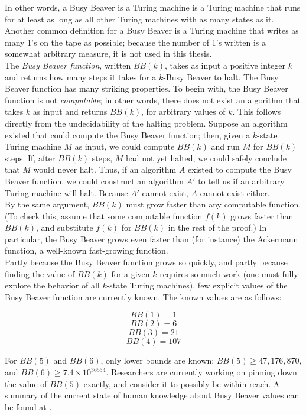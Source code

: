 \documentclass[11pt]{report}
\begin{document}
In other words, a Busy Beaver is a Turing machine is a Turing machine that runs for at least as long as all other Turing machines with as many states as it. Another common definition for a Busy Beaver is a Turing machine that writes as many 1's on the tape as possible; because the number of 1's written is a somewhat arbitrary measure, it is not used in this thesis. \\

The \emph{Busy Beaver function}, written $BB(k)$, takes as input a positive integer $k$ and returns how many steps it takes for a $k$-Busy Beaver to halt. The Busy Beaver function has many striking properties. To begin with, the Busy Beaver function is not \emph{computable}; in other words, there does not exist an algorithm that takes $k$ as input and returns $BB(k)$, for arbitrary values of $k$. This follows directly from the undecidability of the halting problem. Suppose an algorithm existed that could compute the Busy Beaver function; then, given a $k$-state Turing machine $M$ as input, we could compute $BB(k)$ and run $M$ for $BB(k)$ steps. If, after $BB(k)$ steps, $M$ had not yet halted, we could safely conclude that $M$ would never halt. Thus, if an algorithm $A$ existed to compute the Busy Beaver function, we could construct an algorithm $A'$ to tell us if an arbitrary Turing machine will halt. Because $A'$ cannot exist, $A$ cannot exist either. \\

By the same argument, $BB(k)$ must grow faster than any computable function. (To check this, assume that some computable function $f(k)$ grows faster than $BB(k)$, and substitute $f(k)$ for $BB(k)$ in the rest of the proof.) In particular, the Busy Beaver grows even faster than (for instance) the Ackermann function, a well-known fast-growing function. \\

Partly because the Busy Beaver function grows so quickly, and partly because finding the value of $BB(k)$ for a given $k$ requires so much work (one must fully explore the behavior of all $k$-state Turing machines), few explicit values of the Busy Beaver function are currently known. The known values are as follows: 

$$BB(1) = 1$$
$$BB(2) = 6$$
$$BB(3) = 21$$
$$BB(4) = 107$$

For $BB(5)$ and $BB(6)$, only lower bounds are known: $BB(5) \ge 47,176,870$, and $BB(6) \ge 7.4 \times 10^{36534}$. Researchers are currently working on pinning down the value of $BB(5)$ exactly, and consider it to possibly be within reach. A summary of the current state of human knowledge about Busy Beaver values can be found at \cite{bbvalues}.\\
\end{document}
